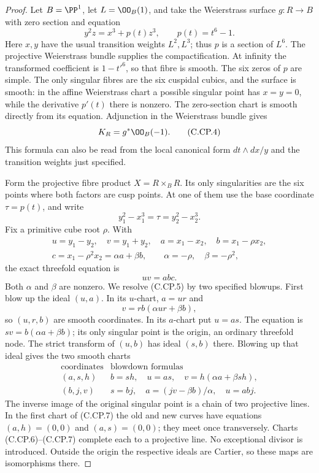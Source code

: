 \begin{proof}
Let $B=\PP^1$, let $L=\OO_B(1)$, and take the Weierstrass
surface $g:R\to B$ with zero section and equation
\[
                  y^2z=x^3+p(t)z^3,
             \qquad p(t)=t^6-1.                 \tag{C.CP.3}
\]
Here $x,y$ have the usual transition weights $L^2,L^3$;
thus $p$ is a section of $L^6$. The projective Weierstrass
bundle supplies the compactification. At infinity the transformed
coefficient is $1-t'^6$, so that fibre is smooth. The six
zeros of $p$ are simple. The only singular fibres are the six
cuspidal cubics, and the surface is smooth: in the affine
Weierstrass chart a possible singular point has $x=y=0$, while
the derivative $p'(t)$ there is nonzero. The zero-section chart
is smooth directly from its equation. Adjunction in the
Weierstrass bundle gives
\[
                         K_R=g^*\OO_B(-1).
 \tag{C.CP.4}
\]
This formula can also be read from the local canonical form
$dt\wedge dx/y$ and the transition weights just specified.

Form the projective fibre product $X=R\times_B R$. Its only
singularities are the six points where both factors are cusp
points. At one of them use the base coordinate $\tau=p(t)$,
and write
\[
 y_1^2-x_1^3=\tau=y_2^2-x_2^3.
\]
Fix a primitive cube root $\rho$. With
\[
 \begin{gathered}
 u=y_1-y_2,\quad v=y_1+y_2,\quad
 a=x_1-x_2,\quad b=x_1-\rho x_2,\\
 c=x_1-\rho^2x_2=\alpha a+\beta b,
 \qquad \alpha=-\rho,\quad\beta=-\rho^2,
 \end{gathered}
\]
the exact threefold equation is
\[
                         uv=abc.                \tag{C.CP.5}
\]
Both $\alpha$ and $\beta$ are nonzero. We resolve (C.CP.5)
by two specified blowups. First blow up the ideal $(u,a)$.
In its $u$-chart, $a=ur$ and
\[
                  v=rb(\alpha ur+\beta b),
 \tag{C.CP.6}
\]
so $(u,r,b)$ are smooth coordinates. In its $a$-chart put
$u=as$. The equation is $sv=b(\alpha a+\beta b)$; its
only singular point is the origin, an ordinary threefold
node. The strict transform of $(u,b)$ has ideal $(s,b)$
there. Blowing up that ideal gives the two smooth charts
\[
 \begin{array}{c|c}
 \text{coordinates}&\text{blowdown formulas}\\ \hline
 (a,s,h)&b=sh,\quad u=as,\quad
                    v=h(\alpha a+\beta sh),\\
 (b,j,v)&s=bj,\quad a=(jv-\beta b)/\alpha,\quad u=abj.
 \end{array}                                    \tag{C.CP.7}
\]
The inverse image of the original singular point is a chain
of two projective lines. In the first chart of (C.CP.7)
the old and new curves have equations $(a,h)=(0,0)$
and $(a,s)=(0,0)$; they meet once transversely. Charts
(C.CP.6)--(C.CP.7) complete each to a projective line.
No exceptional divisor is introduced. Outside the origin
the respective ideals are Cartier, so these maps are
isomorphisms there.


\end{proof}
